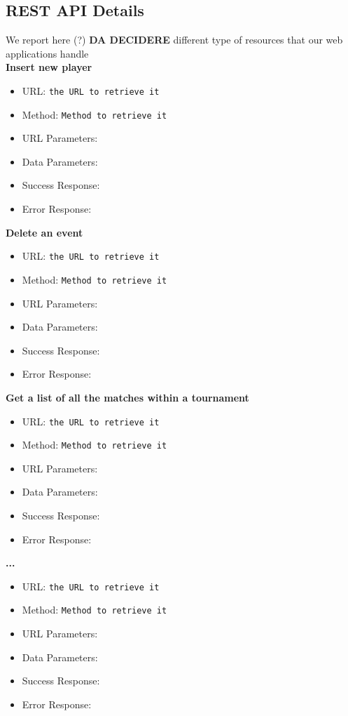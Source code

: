 \subsection{REST API Details}

We report here (?) \textbf{DA DECIDERE} different type of resources that our web applications handle\\
\textbf{Insert new player}
\begin{itemize}
    \item URL: \texttt{the URL to retrieve it}
    \item Method: \texttt{Method to retrieve it}
    \item URL Parameters:
    \item Data Parameters: 
    \item Success Response:
    \item Error Response:
\end{itemize}
\textbf{Delete an event}
\begin{itemize}
    \item URL: \texttt{the URL to retrieve it}
    \item Method: \texttt{Method to retrieve it}
    \item URL Parameters:
    \item Data Parameters: 
    \item Success Response:
    \item Error Response:
\end{itemize}
\textbf{Get a list of all the matches within a tournament}
\begin{itemize}
    \item URL: \texttt{the URL to retrieve it}
    \item Method: \texttt{Method to retrieve it}
    \item URL Parameters:
    \item Data Parameters: 
    \item Success Response:
    \item Error Response:
\end{itemize}
\textbf{...}
\begin{itemize}
    \item URL: \texttt{the URL to retrieve it}
    \item Method: \texttt{Method to retrieve it}
    \item URL Parameters:
    \item Data Parameters: 
    \item Success Response:
    \item Error Response:
\end{itemize}
